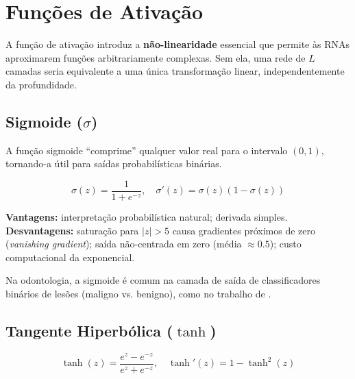 
\section{Funções de Ativação}
\label{sec:funcoes-ativacao}

A função de ativação introduz a \textbf{não-linearidade} essencial que permite às RNAs
aproximarem funções arbitrariamente complexas. Sem ela, uma rede de $L$ camadas seria
equivalente a uma única transformação linear, independentemente da profundidade.

\subsection{Sigmoide ($\sigma$)}

A função sigmoide ``comprime'' qualquer valor real para o intervalo $(0, 1)$,
tornando-a útil para saídas probabilísticas binárias.

\begin{equation}
  \sigma(z) = \frac{1}{1 + e^{-z}}, \quad \sigma'(z) = \sigma(z)(1 - \sigma(z))
  \label{eq:sigmoide}
\end{equation}

\textbf{Vantagens:} interpretação probabilística natural; derivada simples.
\textbf{Desvantagens:} saturação para $|z| > 5$ causa gradientes próximos de zero
(\textit{vanishing gradient}); saída não-centrada em zero (média $\approx 0.5$);
custo computacional da exponencial.

Na odontologia, a sigmoide é comum na camada de saída de classificadores binários
de lesões (maligno vs. benigno), como no trabalho de .

\subsection{Tangente Hiperbólica ($\tanh$)}

\begin{equation}
  \tanh(z) = \frac{e^z - e^{-z}}{e^z + e^{-z}}, \quad \tanh'(z) = 1 - \tanh^2(z)
  \label{eq:tanh}
\end{equation}

